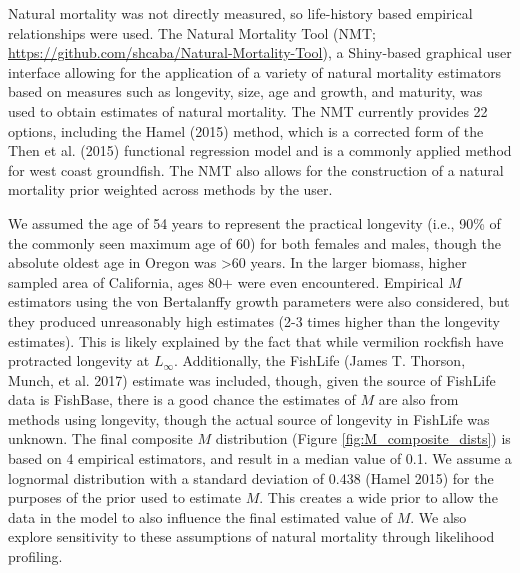 \documentclass[11pt,
  english,
  a4paper,
]{article}
\begin{document}
Natural mortality was not directly measured, so life-history based empirical relationships were used. The Natural Mortality Tool (NMT; {\url{https://github.com/shcaba/Natural-Mortality-Tool}\leavevmode\tagmcend\tagstructend}), a Shiny-based graphical user interface allowing for the application of a variety of natural mortality estimators based on measures such as longevity, size, age and growth, and maturity, was used to obtain estimates of natural mortality. The NMT currently provides 22 options, including the Hamel {(2015)\leavevmode\tagmcend\tagstructend} method, which is a corrected form of the Then et al. {(2015)\leavevmode\tagmcend\tagstructend} functional regression model and is a commonly applied method for west coast groundfish. The NMT also allows for the construction of a natural mortality prior weighted across methods by the user.

\leavevmode\tagmcend\tagstructend\par


We assumed the age of 54 years to represent the practical longevity (i.e., 90\% of the commonly seen maximum age of 60) for both females and males, though the absolute oldest age in Oregon was \textgreater60 years. In the larger biomass, higher sampled area of California, ages 80+ were even encountered. Empirical {\(M\)\leavevmode\tagmcend\tagstructend} estimators using the von Bertalanffy growth parameters were also considered, but they produced unreasonably high estimates (2-3 times higher than the longevity estimates). This is likely explained by the fact that while vermilion rockfish have protracted longevity at {\(L_{\infty}\)\leavevmode\tagmcend\tagstructend}. Additionally, the FishLife {(James T. Thorson, Munch, et al. 2017)\leavevmode\tagmcend\tagstructend} estimate was included, though, given the source of FishLife data is FishBase, there is a good chance the estimates of {\(M\)\leavevmode\tagmcend\tagstructend} are also from methods using longevity, though the actual source of longevity in FishLife was unknown. The final composite {\(M\)\leavevmode\tagmcend\tagstructend} distribution (Figure \ref{fig:M_composite_dists}) is based on 4 empirical estimators, and result in a median value of 0.1. We assume a lognormal distribution with a standard deviation of 0.438 {(Hamel 2015)\leavevmode\tagmcend\tagstructend} for the purposes of the prior used to estimate {\(M\)\leavevmode\tagmcend\tagstructend}. This creates a wide prior to allow the data in the model to also influence the final estimated value of {\(M\)\leavevmode\tagmcend\tagstructend}. We also explore sensitivity to these assumptions of natural mortality through likelihood profiling.
\end{document}
